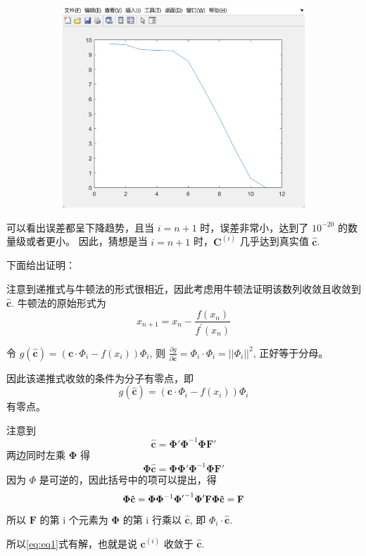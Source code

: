 \begin{figure}[H]
\begin{subfigure}[t]{0.3\textwidth}
		\caption{}
		\label{fig:b}
	\end{subfigure}
	\begin{subfigure}[t]{0.3\textwidth}
		\centering
		\includegraphics[width=\textwidth]{./picture/exp1_3_3}
	\end{subfigure}
\end{figure}

可以看出误差都呈下降趋势，且当 \(i=n+1\) 时，误差非常小，达到了 \(10^{-20}\) 的数量级或者更小。
因此，猜想是当 \(i=n+1\) 时，\(\boldsymbol{C}^{(i)}\) 几乎达到真实值 \(\mathbf{\hat{c}}\).

下面给出证明：

注意到递推式与牛顿法的形式很相近，因此考虑用牛顿法证明该数列收敛且收敛到 \(\mathbf{\hat{c}}\).
牛顿法的原始形式为
\begin{equation}
	x_{n+1}=x_{n}-\frac{f\left(x_{n}\right)}{f^{\prime}\left(x_{n}\right)}
\end{equation}

\hspace{2em}
令 \(g(\mathbf{\hat{c}})=(\mathbf{c}\cdot \Phi_i- f(x_i))\Phi_i\), 则
\(\frac{\partial g}{\partial \mathbf{\hat c}} =\Phi_i \cdot \Phi_i=||\Phi_i||^2\), 正好等于分母。

因此该递推式收敛的条件为分子有零点，即
\begin{equation}
	g(\mathbf{\hat{c}})=(\mathbf{c}\cdot \Phi_i- f(x_i))\Phi_i \label{eq:eq1}
\end{equation}
有零点。

注意到 \[\mathbf{\hat{c}}=\mathbf{\Phi'\Phi}^{-1}\mathbf{\Phi F'}\]
两边同时左乘 \(\mathbf{\Phi}\) 得
\[\mathbf{\Phi}\mathbf{\hat{c}}=\mathbf{\Phi}\mathbf{\Phi'\Phi}^{-1}\mathbf{\Phi F'}\]
因为 \(\Phi\) 是可逆的，因此括号中的项可以提出，得
\[\mathbf{\Phi}\mathbf{\hat{c}}=\mathbf{\Phi}\mathbf{\Phi}^{-1}\mathbf{\Phi'}^{-1}\mathbf{\Phi' F}\\
\mathbf{\Phi}\mathbf{\hat{c}}=\mathbf{F}\]
所以 \(\mathbf{F}\) 的第 i 个元素为 \(\mathbf{\Phi}\) 的第 i 行乘以 \(\mathbf{\hat{c}}\), 即 \(\Phi_i \cdot \mathbf{\hat{c}}\).

所以\eqref{eq:eq1}式有解，也就是说 \(\mathbf{c}^{(i)}\) 收敛于 \(\mathbf{\hat{c}}\).